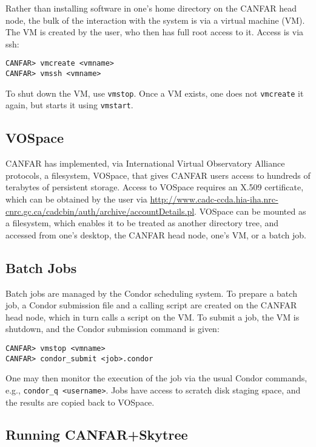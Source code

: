 Rather than installing software in one's home directory on the CANFAR head node, the bulk of the interaction with the system is via a virtual machine (VM). The VM is created by the user, who then has full root access to it. Access is via ssh:

\begin{verbatim}
CANFAR> vmcreate <vmname>
CANFAR> vmssh <vmname>
\end{verbatim}

\noindent To shut down the VM, use {\tt vmstop}. Once a VM exists, one does not {\tt vmcreate} it again, but starts it using {\tt vmstart}.

\subsection{VOSpace}

CANFAR has implemented, via International Virtual Observatory Alliance protocols, a filesystem, VOSpace, that gives CANFAR users access to hundreds of terabytes of persistent storage. Access to VOSpace requires an X.509 certificate, which can be obtained by the user via \url{http://www.cadc-ccda.hia-iha.nrc-cnrc.gc.ca/cadcbin/auth/archive/accountDetails.pl}. VOSpace can be mounted as a filesystem, which enables it to be treated as another directory tree, and accessed from one's desktop, the CANFAR head node, one's VM, or a batch job.

\subsection{Batch Jobs}

Batch jobs are managed by the Condor scheduling system. To prepare a batch job, a Condor submission file and a calling script are created on the CANFAR head node, which in turn calls a script on the VM. To submit a job, the VM is shutdown, and the Condor submission command is given:

\begin{verbatim}
CANFAR> vmstop <vmname>
CANFAR> condor_submit <job>.condor
\end{verbatim}

One may then monitor the execution of the job via the usual Condor commands, e.g., {\tt condor\_q <username>}. Jobs have access to scratch disk staging space, and the results are copied back to VOSpace.

\subsection{Running CANFAR+Skytree}

